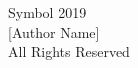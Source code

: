 

\newcommand{\CopyrightYear}{2019}


\begin{titlepage}
\begin{singlespacing}
\begin{center}

\vspace*{35\baselineskip}

Symbol \CopyrightYear\\
\vspace{\baselineskip}	
[Author Name]\\
\vspace{\baselineskip}	
All Rights Reserved
\end{center}
\vfill

\end{singlespacing}
\end{titlepage}

